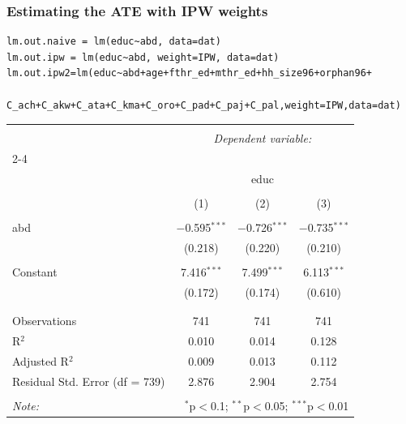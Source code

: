 \documentclass[xcolor=dvipsnames]{beamer}
\begin{document}
\begin{frame}[fragile]
\frametitle{Estimating the ATE with IPW weights}
\scriptsize
\begin{verbatim}
lm.out.naive = lm(educ~abd, data=dat) 
lm.out.ipw = lm(educ~abd, weight=IPW, data=dat) 
lm.out.ipw2=lm(educ~abd+age+fthr_ed+mthr_ed+hh_size96+orphan96+
    C_ach+C_akw+C_ata+C_kma+C_oro+C_pad+C_paj+C_pal,weight=IPW,data=dat) 
\end{verbatim}

\vspace{-.1in}
\begin{table}[!htbp] \centering 
  \label{} 
\begin{tabular}{@{\extracolsep{5pt}}lccc} 
\\[-1.8ex]\hline 
\hline \\[-1.8ex] 
 & \multicolumn{3}{c}{\textit{Dependent variable:}} \\ 
\cline{2-4} 
\\[-1.8ex] & \multicolumn{3}{c}{educ} \\ 
\\[-1.8ex] & (1) & (2) & (3)\\ 
\hline \\[-1.8ex] 
 abd & $-$0.595$^{***}$ & $-$0.726$^{***}$ & $-$0.735$^{***}$ \\ 
  & (0.218) & (0.220) & (0.210) \\ 
  & & & \\ 
 Constant & 7.416$^{***}$ & 7.499$^{***}$ & 6.113$^{***}$ \\ 
  & (0.172) & (0.174) & (0.610) \\ 
  & & & \\ 
\hline \\[-1.8ex] 
Observations & 741 & 741 & 741 \\ 
R$^{2}$ & 0.010 & 0.014 & 0.128 \\ 
Adjusted R$^{2}$ & 0.009 & 0.013 & 0.112 \\ 
Residual Std. Error (df = 739) & 2.876 & 2.904 & 2.754 \\ 
\hline 
\hline \\[-1.8ex] 
\textit{Note:}  & \multicolumn{3}{r}{$^{*}$p$<$0.1; $^{**}$p$<$0.05; $^{***}$p$<$0.01} \\ 
\end{tabular} 
\end{table} 
\end{frame}
\end{document}
